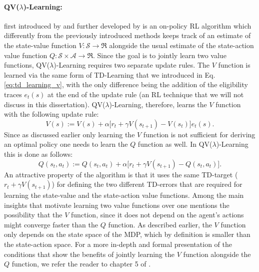 \paragraph{QV($\lambda$)-Learning:} first introduced by \citet{wiering2005qv} and further developed by \citet{wiering2009qv} is an on-policy RL algorithm which differently from the previously introduced methods keeps track of an estimate of the state-value function $V:\mathcal{S}\rightarrow\Re$ alongside the usual estimate of the state-action value function $Q:\mathcal{S}\times\mathcal{A}\rightarrow\Re$. Since the goal is to jointly learn two value functions, QV($\lambda$)-Learning requires two separate update rules. The $V$ function is learned via the same form of TD-Learning that we introduced in Eq. \ref{eq:td_learning_v}, with the only difference being the addition of the eligibility traces $e_t(s)$ at the end of the update rule (an RL technique that we will not discuss in this dissertation). QV($\lambda$)-Learning, therefore, learns the $V$ function with the following update rule:
\begin{equation}
V(s):= V(s) + \alpha \big[ r_{t} + \gamma V(s_{t+1}) - V(s_t) \big] e_{t}(s).
\label{eq:qv_lambda_v_update}
\end{equation}
Since as discussed earlier only learning the $V$ function is not sufficient for deriving an optimal policy one needs to learn the $Q$ function as well. In QV($\lambda$)-Learning this is done as follows:
\begin{equation}
Q(s_{t}, a_{t}):= Q(s_{t}, a_{t}) + \alpha \big[r_{t} + \gamma V(s_{t+1}) - Q(s_{t}, a_{t}) \big].
\label{eq:qv_lambda_q_update}
\end{equation}
An attractive property of the algorithm is that it uses the same TD-target ($r_t + \gamma V(s_{t+1})$) for defining the two different TD-errors that are required for learning the state-value and the state-action value functions. Among the main insights that motivate learning two value functions over one \citet{wiering2005qv} mentions the possibility that the $V$ function, since it does not depend on the agent's actions might converge faster than the $Q$ function. As described earlier, the $V$ function only depends on the state space of the MDP, which by definition is smaller than the state-action space. For a more in-depth and formal presentation of the conditions that show the benefits of jointly learning the $V$ function alongside the $Q$ function, we refer the reader to chapter 5 of \cite{van2011insights}.


